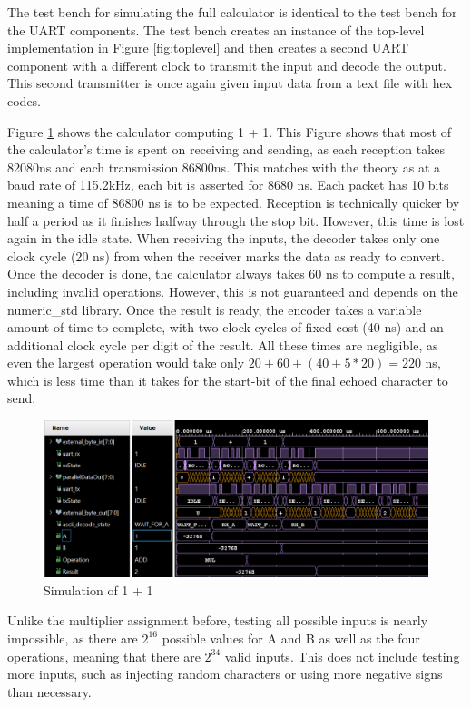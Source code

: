\documentclass[11pt]{article}
\begin{document}
The test bench for simulating the full calculator is identical to the test bench for the UART components.
The test bench creates an instance of the top-level implementation in Figure \ref{fig:toplevel}
and then creates a second UART component with a different clock to transmit the input and decode the output.
This second transmitter is once again given input data from a text file with hex codes.

Figure \ref{fig:sim} shows the calculator computing 1 + 1.
This Figure shows that most of the calculator's time is spent on receiving and sending, as each reception takes 82080ns and each transmission 86800ns.
This matches with the theory as at a baud rate of 115.2kHz, each bit is asserted for 8680 ns.
Each packet has 10 bits meaning a time of 86800 ns is to be expected.
Reception is technically quicker by half a period as it finishes halfway through the stop bit.
However, this time is lost again in the idle state.
When receiving the inputs, the decoder takes only one clock cycle (20 ns) from when the receiver marks the data as ready to convert.
Once the decoder is done, the calculator always takes 60 ns to compute a result, including invalid operations.
However, this is not guaranteed and depends on the numeric\_std library. 
Once the result is ready, the encoder takes a variable amount of time to complete, with two clock cycles of fixed cost (40 ns) and an additional clock cycle per digit of the result.
All these times are negligible, as even the largest operation would take only $20 + 60 + (40 + 5 * 20) = 220$ ns, which is less time than it takes for the start-bit of the final echoed character to send.

\begin{figure}[H]        
    \centering
    \includegraphics[width=.75\textwidth]{Sim1+1.png}
    \caption{Simulation of 1 + 1}
    \label{fig:sim}
\end{figure} 

Unlike the multiplier assignment before, testing all possible inputs is nearly impossible, as there are $2^{16}$ possible values for A and B as well as the four operations, meaning that there are $2^{34}$ valid inputs.
This does not include testing more inputs, such as injecting random characters or using more negative signs than necessary.
\end{document}
